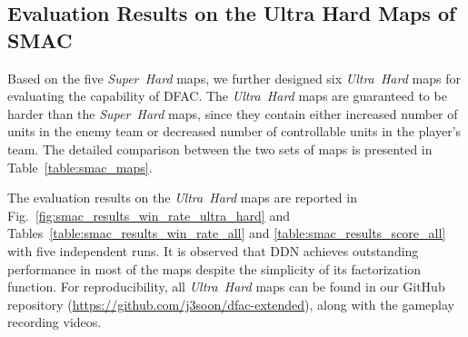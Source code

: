 \documentclass[twoside,11pt]{article}
\newcommand{\superhard}{\textit{Super~Hard}}
\newcommand{\ultrahard}{\textit{Ultra~Hard}}
\newcommand{\ddn}{DDN}
\begin{document}
\subsection{Evaluation Results on the Ultra Hard Maps of SMAC}
\label{subsec:experiment_results_ultra_hard}

Based on the five \superhard{} maps, we further designed six \ultrahard{} maps for evaluating the capability of DFAC. The \ultrahard{} maps are guaranteed to be harder than the \superhard{} maps, since they contain either increased number of units in the enemy team or decreased number of controllable units in the player's team. The detailed comparison between the two sets of maps is presented in Table~\ref{table:smac_maps}.

The evaluation results on the \ultrahard{} maps are reported in Fig.~\ref{fig:smac_results_win_rate_ultra_hard} and Tables~\ref{table:smac_results_win_rate_all} and \ref{table:smac_results_score_all} with five independent runs. It is observed that \ddn{} achieves outstanding performance in most of the maps despite the simplicity of its factorization function. For reproducibility, all \ultrahard{} maps can be found in our GitHub repository (\href{https://github.com/j3soon/dfac-extended}{https://github.com/j3soon/dfac-extended}), along with the gameplay recording videos.
\end{document}
